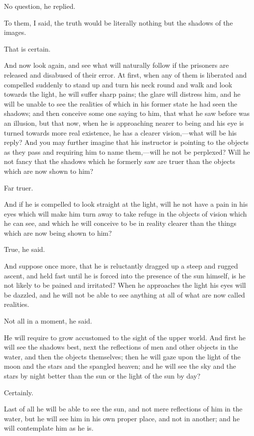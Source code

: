No question, he replied.

To them, I said, the truth would be literally nothing but the shadows
of the images.

That is certain.

And now look again, and see what will naturally follow if the
prisoners are released and disabused of their error. At first, when
any of them is liberated and compelled suddenly to stand up and turn
his neck round and walk and look towards the light, he will suffer
sharp pains; the glare will distress him, and he will be unable to see
the realities of which in his former state he had seen the shadows;
and then conceive some one saying to him, that what he saw before was
an illusion, but that now, when he is approaching nearer to being and
his eye is turned towards more real existence, he has a clearer
vi\-sion,---what will be his reply? And you may further imagine that
his instructor is pointing to the objects as they pass and requiring
him to name them,---will he not be perplexed? Will he not fancy that
the shadows which he formerly saw are truer than the objects which are
now shown to him?

Far truer.

And if he is compelled to look straight at the light, will he not have
a pain in his eyes which will make him turn away to take refuge in the
objects of vision which he can see, and which he will conceive to be
in reality clearer than the things which are now being shown to him?

True, he said.

And suppose once more, that he is reluctantly dragged up a steep and
rugged ascent, and held fast until he is forced into the presence of
the sun himself, is he not likely to be pained and irritated? When he
approaches the light his eyes will be dazzled, and he will not be able
to see anything at all of what are now called realities.

Not all in a moment, he said.

He will require to grow accustomed to the sight of the upper world.
And first he will see the shadows best, next the reflections of men
and other objects in the water, and then the objects themselves; then
he will gaze upon the light of the moon and the stars and the spangled
heaven; and he will see the sky and the stars by night better than the
sun or the light of the sun by day?

Certainly.

Last of all he will be able to see the sun, and not mere reflections
of him in the water, but he will see him in his own proper place, and
not in another; and he will contemplate him as he is.

